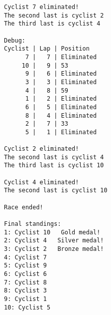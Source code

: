 \documentclass[12pt,a4paper]{article}
\begin{document}
\begin{verbatim}
Cyclist 7 eliminated!
The second last is cyclist 2
The third last is cyclist 4

Debug:
Cyclist | Lap | Position
      7 |   7 | Eliminated
     10 |   9 | 53
      9 |   6 | Eliminated
      3 |   3 | Eliminated
      4 |   8 | 59
      1 |   2 | Eliminated
      6 |   5 | Eliminated
      8 |   4 | Eliminated
      2 |   7 | 33
      5 |   1 | Eliminated

Cyclist 2 eliminated!
The second last is cyclist 4
The third last is cyclist 10

Cyclist 4 eliminated!
The second last is cyclist 10

Race ended!

Final standings:
1: Cyclist 10   Gold medal!
2: Cyclist 4   Silver medal!
3: Cyclist 2   Bronze medal!
4: Cyclist 7
5: Cyclist 9
6: Cyclist 6
7: Cyclist 8
8: Cyclist 3
9: Cyclist 1
10: Cyclist 5
\end{verbatim}
\end{document}
